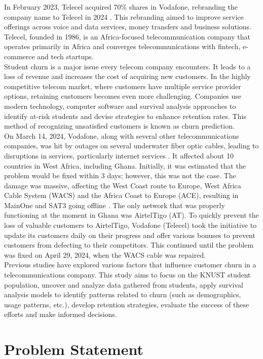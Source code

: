 \documentclass[doublespacing,12pt]{report}
\begin{document}
In February 2023, Telecel acquired 70\% shares in Vodafone, rebranding the company name to Telecel in 2024 \cite{telecel_ghana}. This rebranding aimed to improve service offerings across voice and data services, money transfers and business solutions. Telecel, founded in 1986, is an Africa-focused telecommunication company that operates primarily in Africa and converges telecommunications with fintech, e-commerce and tech startups.\\
Student churn is a major issue every telecom company encounters. It leads to a loss of revenue and increases the cost of acquiring new customers. In the highly competitive telecom market, where customers have multiple service provider options, retaining customers becomes even more challenging. Companies use modern technology, computer software and survival analysis approaches to identify at-risk students and devise strategies to enhance retention rates. This method of recognizing unsatisfied customers is known as churn prediction.\\
On March 14, 2024, Vodafone, along with several other telecommunications companies, was hit by outages on several underwater fiber optic cables, leading to disruptions in services, particularly internet services \cite{ghanaweb2023}. It affected about 10 countries in West Africa, including Ghana. Initially, it was estimated that the problem would be fixed within 3 days; however, this was not the case. The damage was massive, affecting the West Coast route to Europe, West Africa Cable System (WACS) and the Africa Coast to Europe (ACE), resulting in MainOne and SAT3 going offline \cite{apnews2023}. The only network that was properly functioning at the moment in Ghana was AirtelTigo (AT). To quickly prevent the loss of valuable customers to AirtelTigo, Vodafone (Telecel) took the initiative to update its customers daily on their progress and offer various bonuses to prevent customers from defecting to their competitors. This continued until the problem was fixed on April 29, 2024, when the WACS cable was repaired.\\
Previous studies have explored various factors that influence customer churn in a telecommunications company. This study aims to focus on the KNUST student population, uncover and analyze data gathered from students, apply survival analysis models to identify patterns related to churn (such as demographics, usage patterns, etc.), develop retention strategies, evaluate the success of these efforts and make informed decisions.

\section{Problem Statement}
\end{document}
